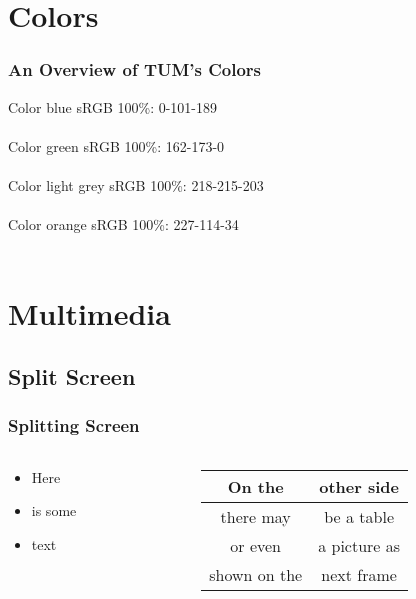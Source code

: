 \documentclass{beamer}
\begin{document}
\section{Colors}
\begin{frame}
   \frametitle{An Overview of TUM's Colors}
   \tiny{Color blue sRGB 100\%: 0-101-189} \\
   \colorbox{tumcolor-blue}{}{}  \\
   \vspace{0.5cm}
   \tiny{Color green sRGB 100\%: 162-173-0} \\
   \colorbox{tumcolor-green}{}{} \\
   \vspace{0.5cm}
   \tiny{Color light grey sRGB 100\%: 218-215-203} \\
   \colorbox{tumcolor-lightgrey}{}{} \\
   \vspace{0.5cm}
   \tiny{Color orange sRGB 100\%: 227-114-34} \\
   \colorbox{tumcolor-orange}{}{} \\
   \vspace{0.5cm}
\end{frame}



\section{Multimedia}
\subsection{Split Screen}
\begin{frame}
   \frametitle{Splitting Screen}
   \begin{columns}

      \begin{column}{5cm}
         \begin{itemize}
            \item Here
            \item is some
            \item text
         \end{itemize}
      \end{column}

      \begin{column}{5cm}
         \begin{tabular}{|c|c|}
            \hline
            \textbf{On the} & \textbf{other side} \\
            \hline
            there may &  be a table \\
            \hline
            or even &  a picture as  \\
            \hline
            shown on the &  next frame  \\
            \hline
         \end{tabular}
      \end{column}

   \end{columns}
\end{frame}
\end{document}
